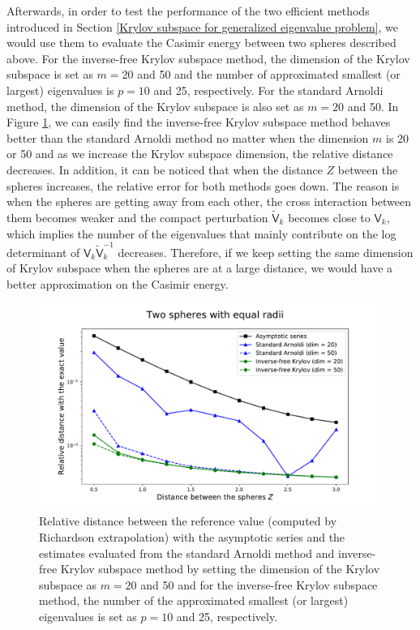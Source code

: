 Afterwards, in order to test the performance of the two efficient methods introduced in Section \ref{Krylov subspace for generalized eigenvalue problem}, we
would use them to evaluate the Casimir energy between two spheres described above. For the inverse-free Krylov subspace method, the dimension of the Krylov subspace is set as $m = 20$ and 50 and the 
number of approximated smallest (or largest) eigenvalues is $p = 10$ and 25, respectively. For the standard Arnoldi method, the dimension of the 
Krylov subspace is also set as $m = 20$ and 50. In Figure \ref{equal_radii_rel_dist}, we can easily find the inverse-free Krylov subspace method behaves better 
than the standard Arnoldi method no matter when the dimension $m$ is 20 or 50 and as we increase the Krylov subspace dimension, the relative distance decreases.
In addition, it can be noticed that when the distance $Z$ between the spheres increases, the relative error 
for both methods goes down. The reason is when the spheres are getting away from each other, the cross interaction between them becomes weaker and the compact 
perturbation $\tilde{\mathsf{V}}_{k}$ becomes close to $\mathsf{V}_{k}$, which implies the number of the eigenvalues that mainly contribute on the log 
determinant of $\mathsf{V}_{k}\tilde{\mathsf{V}}_{k}^{-1}$ decreases. Therefore, if we keep setting the same dimension of Krylov subspace when the spheres
are at a large distance, we would have a better approximation on the Casimir energy.


\begin{figure}[H]
    \includegraphics[scale = 0.7]{figures/relative_distance_equal_radii.pdf}
    \caption{Relative distance between the reference value (computed by Richardson extrapolation) with the asymptotic series and the estimates evaluated from 
    the standard Arnoldi method and inverse-free Krylov subspace method by setting the dimension of the Krylov subspace as $m = 20$ and 50 and for the inverse-free
    Krylov subspace method, the number of the approximated smallest (or largest) eigenvalues is set as $p = 10$ and 25, respectively.}
    \label{equal_radii_rel_dist}
\end{figure}
 
